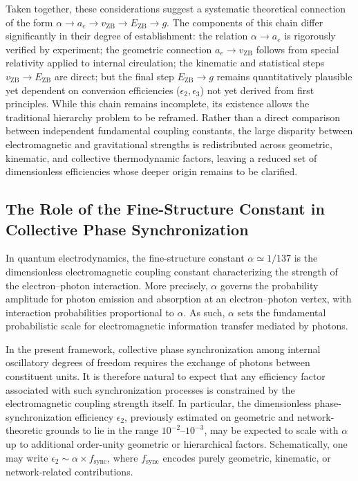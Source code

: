\documentclass[12pt,letterpaper]{article}
\begin{document}
Taken together, these considerations suggest a systematic theoretical connection of the form $\alpha \rightarrow a_e \rightarrow v_{\mathrm{ZB}} \rightarrow E_{\mathrm{ZB}} \rightarrow g$. The components of this chain differ significantly in their degree of establishment: the relation $\alpha \to a_e$ is rigorously verified by experiment; the geometric connection $a_e \to v_{\mathrm{ZB}}$ follows from special relativity applied to internal circulation; the kinematic and statistical steps $v_{\mathrm{ZB}} \to E_{\mathrm{ZB}}$ are direct; but the final step $E_{\mathrm{ZB}} \to g$ remains quantitatively plausible yet dependent on conversion efficiencies ($\epsilon_2, \epsilon_3$) not yet derived from first principles. While this chain remains incomplete, its existence allows the traditional hierarchy problem to be reframed. Rather than a direct comparison between independent fundamental coupling constants, the large disparity between electromagnetic and gravitational strengths is redistributed across geometric, kinematic, and collective thermodynamic factors, leaving a reduced set of dimensionless efficiencies whose deeper origin remains to be clarified.


\subsection{The Role of the Fine-Structure Constant in Collective Phase Synchronization}

In quantum electrodynamics, the fine-structure constant $\alpha \simeq 1/137$ is the dimensionless electromagnetic coupling constant characterizing the strength of the electron--photon interaction. More precisely, $\alpha$ governs the probability amplitude for photon emission and absorption at an electron--photon vertex, with interaction probabilities proportional to $\alpha$. As such, $\alpha$ sets the fundamental probabilistic scale for electromagnetic information transfer mediated by photons.

In the present framework, collective phase synchronization among internal oscillatory degrees of freedom requires the exchange of photons between constituent units. It is therefore natural to expect that any efficiency factor associated with such synchronization processes is constrained by the electromagnetic coupling strength itself. In particular, the dimensionless phase-synchronization efficiency $\epsilon_2$, previously estimated on geometric and network-theoretic grounds to lie in the range $10^{-2}$--$10^{-3}$, may be expected to scale with $\alpha$ up to additional order-unity geometric or hierarchical factors. Schematically, one may write $\epsilon_2 \sim \alpha \times f_{\mathrm{sync}}$, where $f_{\mathrm{sync}}$ encodes purely geometric, kinematic, or network-related contributions.
\end{document}
